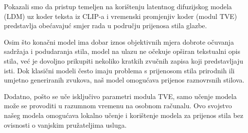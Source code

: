 Pokazali smo da pristup temeljen na korištenju latentnog difuzijskog modela (LDM) uz koder teksta iz CLIP-a i vremenski promjenjiv koder (modul TVE) predstavlja obećavajuć smjer rada u području prijenosa stila glazbe.

Osim što konačni model ima dobar iznos objektivnih mjera dobrote očuvanja sadržaja i podudaranja stila, model na ulazu ne očekuje opširan tekstualni opis stila, već je dovoljno prikupiti nekoliko kratkih zvučnih zapisa koji predstavljaju isti. Dok klasični modeli često imaju problema s prijenosom stila prirodnih ili umjetno generiranih zvukova, naš model omogućava prijenos raznovrsnih stilova.

Dodatno, pošto se uče isključivo parametri modula TVE, samo učenje modela može se provoditi u razumnom vremenu na osobnom računalu. Ovo svojstvo našeg modela omogućava lokalno učenje i korištenje modela za prijenos stila bez ovisnosti o vanjskim pružateljima usluga.